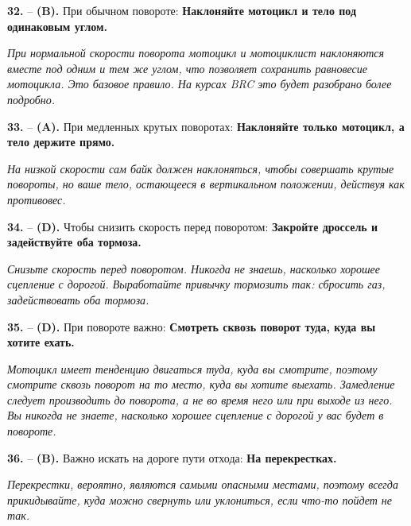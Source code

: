 \begin{minipage}{\linewidth}
\noindent\textbf{32.}  -- \textbf {(B).} При обычном повороте:  \textbf {Наклоняйте мотоцикл и тело под одинаковым углом.} \par \textit {При нормальной скорости поворота мотоцикл и мотоциклист наклоняются вместе под одним и тем же углом, что позволяет сохранить равновесие мотоцикла. Это базовое правило. На курсах BRC это будет разобрано более подробно.} \\
\end{minipage}

\begin{minipage}{\linewidth}
\noindent\textbf{33.}  -- \textbf {(A).} При медленных крутых поворотах:  \textbf {Наклоняйте только мотоцикл, а тело держите прямо.} \par \textit {На низкой скорости сам байк должен наклоняться, чтобы совершать крутые повороты, но ваше тело, остающееся в вертикальном положении, действуя как противовес.} \\
\end{minipage}

\begin{minipage}{\linewidth}
\noindent\textbf{34.}  -- \textbf {(D).} Чтобы снизить скорость перед поворотом:  \textbf {Закройте дроссель и задействуйте оба тормоза.} \par \textit {Снизьте скорость перед поворотом. Никогда не знаешь, насколько хорошее сцепление с дорогой. Выработайте привычку тормозить так: сбросить газ, задействовать оба тормоза.} \\
\end{minipage}

\begin{minipage}{\linewidth}
\noindent\textbf{35.}  -- \textbf {(D).} При повороте важно:  \textbf {Смотреть сквозь поворот туда, куда вы хотите ехать.} \par \textit {Мотоцикл имеет тенденцию двигаться туда, куда вы смотрите, поэтому смотрите сквозь поворот на то место, куда вы хотите выехать. Замедление следует производить до поворота, а не во время него или при выходе из него. Вы никогда не знаете, насколько хорошее сцепление с дорогой у вас будет в повороте.} \\
\end{minipage}

\begin{minipage}{\linewidth}
\noindent\textbf{36.}  -- \textbf {(B).} Важно искать на дороге пути отхода:  \textbf {На перекрестках.} \par \textit {Перекрестки, вероятно, являются самыми опасными местами, поэтому всегда прикидывайте, куда можно свернуть или уклониться, если что-то пойдет не так.} \\
\end{minipage}


